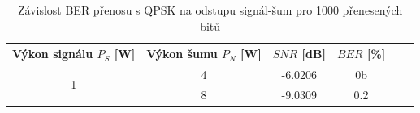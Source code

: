 

\begin{table}[h]
  \centering
  \begin{tabular}{|c|c|c|c|c|c|}
    \hline
    Výkon signálu $P_S$ [W] & Výkon šumu $P_N$ [W] & $SNR$ [dB] & $BER$ [\%] \\
    \hline
    \multirow{3}{*}{1}        & 4                    & -6.0206       & 0b          \\
    \cline{2-4}             & 8                    & -9.0309  & 0.2   \\
    \hline
  \end{tabular}
  \caption{Závislost BER přenosu s QPSK na odstupu signál-šum pro 1000 přenesených bitů}
\end{table}

